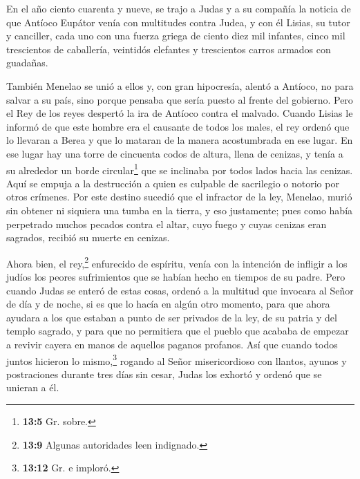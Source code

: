  En el año ciento cuarenta y nueve, se trajo a Judas y a
su compañía la noticia de que Antíoco Eupátor venía con multitudes
contra Judea,  y con él Lisias, su tutor y canciller, cada
uno con una fuerza griega de ciento diez mil infantes, cinco mil
trescientos de caballería, veintidós elefantes y trescientos carros
armados con guadañas.

 También Menelao se unió a ellos y, con gran hipocresía,
alentó a Antíoco, no para salvar a su país, sino porque pensaba que
sería puesto al frente del gobierno.  Pero el Rey de los
reyes despertó la ira de Antíoco contra el malvado. Cuando Lisias le
informó de que este hombre era el causante de todos los males, el rey
ordenó que lo llevaran a Berea y que lo mataran de la manera
acostumbrada en ese lugar.  En ese lugar hay una torre de
cincuenta codos de altura, llena de cenizas, y tenía a su alrededor un
borde circular\footnote{\textbf{13:5} Gr. sobre.} que se inclinaba por
todos lados hacia las cenizas.  Aquí se empuja a la
destrucción a quien es culpable de sacrilegio o notorio por otros
crímenes.  Por este destino sucedió que el infractor de la
ley, Menelao, murió sin obtener ni siquiera una tumba en la tierra, y
eso justamente;  pues como había perpetrado muchos pecados
contra el altar, cuyo fuego y cuyas cenizas eran sagrados, recibió su
muerte en cenizas.

 Ahora bien, el rey,\footnote{\textbf{13:9} Algunas
  autoridades leen indignado.} enfurecido de espíritu, venía con la
intención de infligir a los judíos los peores sufrimientos que se habían
hecho en tiempos de su padre.  Pero cuando Judas se
enteró de estas cosas, ordenó a la multitud que invocara al Señor de día
y de noche, si es que lo hacía en algún otro momento, para que ahora
ayudara a los que estaban a punto de ser privados de la ley, de su
patria y del templo sagrado,  y para que no permitiera
que el pueblo que acababa de empezar a revivir cayera en manos de
aquellos paganos profanos.  Así que cuando todos juntos
hicieron lo mismo,\footnote{\textbf{13:12} Gr. e imploró.} rogando al
Señor misericordioso con llantos, ayunos y postraciones durante tres
días sin cesar, Judas los exhortó y ordenó que se unieran a él.

